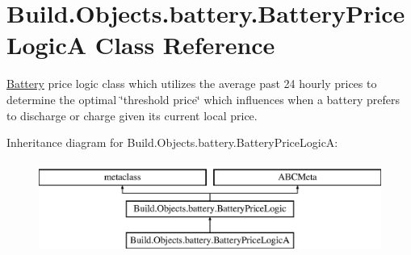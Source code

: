 \hypertarget{class_build_1_1_objects_1_1battery_1_1_battery_price_logic_a}{}\section{Build.\+Objects.\+battery.\+Battery\+Price\+LogicA Class Reference}
\label{class_build_1_1_objects_1_1battery_1_1_battery_price_logic_a}


\hyperlink{class_build_1_1_objects_1_1battery_1_1_battery}{Battery} price logic class which utilizes the average past 24 hourly prices to determine the optimal \char`\"{}threshold price\char`\"{} which influences when a battery prefers to discharge or charge given its current local price.  


Inheritance diagram for Build.\+Objects.\+battery.\+Battery\+Price\+LogicA\+:\begin{figure}[H]
\begin{center}
\leavevmode
\includegraphics[height=3.000000cm]{class_build_1_1_objects_1_1battery_1_1_battery_price_logic_a}
\end{center}
\end{figure}
